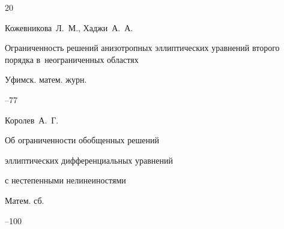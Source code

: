 \begin{thebibliography}{20}

\by Кожевникова~Л.~М., Хаджи~А.~А.

\paper Ограниченность решений анизотропных эллиптических уравнений второго порядка в~неограниченных областях

\jour Уфимск. матем. журн.




--77















\by Королев~А.~Г.

\paper Об ограниченности обобщенных решений

эллиптических дифференциальных уравнений

с нестепенными нелинеиностями

\jour Матем. сб.




--100












\end{thebibliography}
